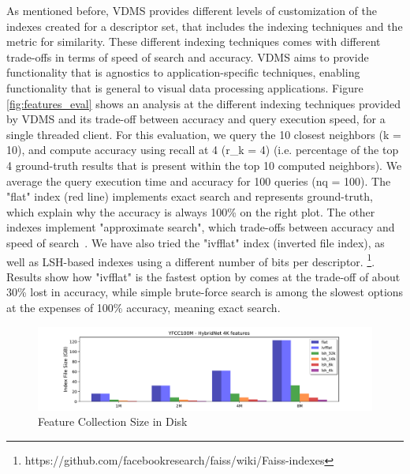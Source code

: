 As mentioned before, VDMS provides different levels of customization of the
indexes created for a descriptor set, that includes the indexing techniques
and the metric for similarity.
These different indexing techniques comes with different trade-offs in terms
of speed of search and accuracy.
VDMS aims to provide functionality that is agnostics to application-specific
techniques, enabling functionality that is general to visual data processing
applications.
Figure \ref{fig:features_eval} shows an analysis at the different indexing
techniques provided by VDMS and its trade-off between accuracy and query
execution speed, for a single threaded client.
For this evaluation, we query the 10 closest neighbors (k = 10), and compute
accuracy using recall at 4 (r\_k = 4) (i.e. percentage of the top 4 ground-truth
results that is present within the top 10 computed neighbors).
We average the query execution time and accuracy for 100 queries (nq = 100).
The "flat" index (red line) implements exact search and
represents ground-truth, which explain why the accuracy is always 100\% on the
right plot. The other indexes implement "approximate search", which trade-offs
between accuracy and speed of search~\cite{flann, faiss}.
We have also tried the "ivfflat" index (inverted file index), as well as
LSH-based indexes using a different number of bits per descriptor.
\footnote{https://github.com/facebookresearch/faiss/wiki/Faiss-indexes}.
Results show how "ivfflat" is the fastest option by comes at the trade-off
of about 30\% lost in accuracy, while simple brute-force search
is among the slowest options at the expenses of 100\% accuracy,
meaning exact search.

\begin{figure}[]
\centering
\includegraphics[width=\textwidth]{figures/features_disksize}
\caption{Feature Collection Size in Disk}
\label{fig:features_size_does_matter}
\end{figure}


